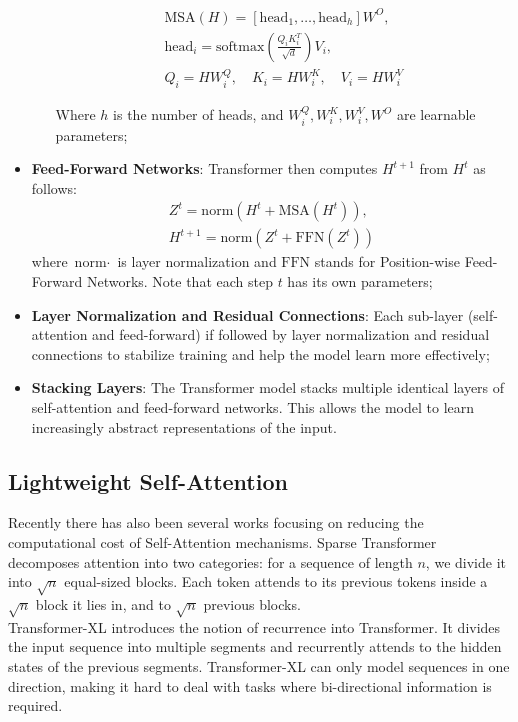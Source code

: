 \begin{itemize}
\begin{itemize}
        \begin{align*}
            \text{MSA}(H) = \left[ \text{head}_1, \dots, \text{head}_h \right]
            W^O,\\
            \text{head}_i = \text{softmax}\left( \frac{Q_i K_i^T}{\sqrt{d}} 
            \right) V_i,\\
            Q_i = H W_i^Q, \quad K_i = H W_i^K, \quad V_i = H W_i^V
        \end{align*}

        Where $h$ is the number of heads, and $W_i^Q, W_i^K, W_i^V, W^O$ are
        learnable parameters;
    \end{itemize}

    \item \textbf{Feed-Forward Networks}:
        Transformer then computes $H^{t+1}$ from $H^t$ as follows:
        \begin{align}
            Z^t = \text{norm} \left( {H^t + \text{MSA}(H^t)} \right),\\
            H^{t+1} = \text{norm} \left( {Z^t + \text{FFN}(Z^t)} \right)
        \end{align}
        where $\text{norm}{\cdot}$ is layer normalization and $\text{FFN}$ 
        stands for Position-wise Feed-Forward Networks. Note that each step $t$ 
        has its own parameters;

    \item \textbf{Layer Normalization and Residual Connections}:
        Each sub-layer (self-attention and feed-forward) if followed by layer
        normalization and residual connections to stabilize training and help
        the model learn more effectively;

    \item \textbf{Stacking Layers}:
        The Transformer model stacks multiple identical layers of self-attention
        and feed-forward networks. This allows the model to learn increasingly
        abstract representations of the input.
\end{itemize}

\subsection{Lightweight Self-Attention}

Recently there has also been several works focusing on reducing the
computational cost of Self-Attention mechanisms. Sparse Transformer decomposes
attention into two categories: for a sequence of length $n$, we divide it into
$\sqrt{n}$ equal-sized blocks. Each token attends to its previous tokens inside
a $\sqrt{n}$ block it lies in, and to $\sqrt{n}$ previous blocks.\\
Transformer-XL introduces the notion of recurrence into Transformer. It divides
the input sequence into multiple segments and recurrently attends to the hidden
states of the previous segments. Transformer-XL can only model sequences in one
direction, making it hard to deal with tasks where bi-directional information is
required.

